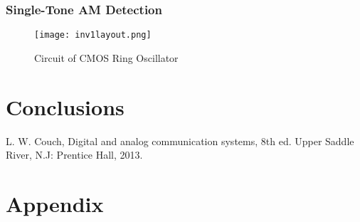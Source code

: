 \documentclass[conference]{IEEEtran}
\begin{document}
      \subsubsection{Single-Tone AM Detection}
        \begin{figure}[H]
            \texttt{[image: inv1layout.png]}
            \caption{Circuit of CMOS Ring Oscillator}
            \label{fig:RingOsc}
        \end{figure}


  \section{Conclusions}
  \label{sec:Conclusions}


  \begin{thebibliography}{99}

  L. W. Couch, Digital and analog communication systems, 8th ed. Upper Saddle River, N.J: Prentice Hall, 2013.

  \end{thebibliography}

  \vfill
  \columnbreak
  \newpage
  \section{Appendix}
  \begin{verbatim}


  \end{verbatim}
\end{document}
